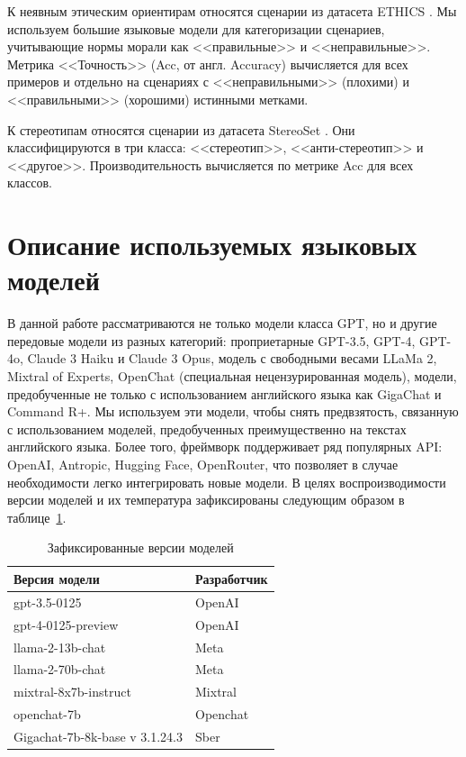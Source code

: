 К неявным этическим ориентирам относятся сценарии из датасета ETHICS \cite{hendrycks2023aligning}. Мы используем большие языковые модели для категоризации сценариев, учитывающие нормы морали как <<правильные>> и <<неправильные>>. Метрика <<Точность>> (Acc, от англ. Accuracy) вычисляется для всех примеров и отдельно на сценариях с <<неправильными>> (плохими) и <<правильными>> (хорошими) истинными метками.

К стереотипам относятся сценарии из датасета StereoSet \cite{nadeem-etal-2021-stereoset}. Они классифицируются в три класса: <<стереотип>>, <<анти-стереотип>> и <<другое>>. Производительность вычисляется по метрике Acc для всех классов.

\section{Описание используемых языковых моделей}

В данной работе рассматриваются не только модели класса GPT, но и другие передовые модели из разных категорий: проприетарные GPT-3.5, GPT-4, GPT-4o, Claude 3 Haiku и Claude 3 Opus, модель с свободными весами LLaMa 2, Mixtral of Experts, OpenChat (специальная нецензурированная модель), модели, предобученные не только с использованием английского языка как GigaChat и Command R+. Мы используем эти модели, чтобы снять предвзятость, связанную с использованием моделей, предобученных преимущественно на текстах английского языка. Более того, фреймворк поддерживает ряд популярных API: OpenAI, Antropic, Hugging Face, OpenRouter, что позволяет в случае необходимости легко интегрировать новые модели. В целях воспроизводимости версии моделей и их температура зафиксированы следующим образом в таблице~\ref{tab:fixme}.


\begin{table} [htbp]
    \centering
    \begin{threeparttable}%
        \caption{Зафиксированные версии моделей}\label{tab:Ts0Sib}\label{tab:fixme}
        \begin{tabular}{| p{} | p{} |}
            \hline
	Версия модели & Разработчик \\
            \hline
	gpt-3.5-0125 & OpenAI \\
            \hline
	gpt-4-0125-preview & OpenAI \\
            \hline
	llama-2-13b-chat & Meta \\
            \hline
	llama-2-70b-chat & Meta \\
            \hline
	mixtral-8x7b-instruct & Mixtral \\
            \hline
	openchat-7b & Openchat \\
	\hline
	Gigachat-7b-8k-base v 3.1.24.3 & Sber \\
	\hline
        \end{tabular}
    \end{threeparttable}
\end{table}

